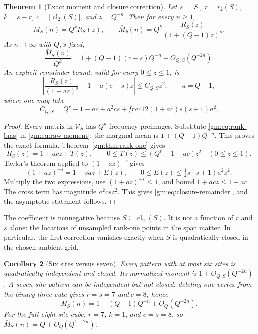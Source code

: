 \documentclass[11pt,a4paper]{article}
\numberwithin{equation}{section}
\newtheorem{theorem}{Theorem}[section]
\newtheorem{corollary}[theorem]{Corollary}
\theoremstyle{definition}
\theoremstyle{remark}
\newcommand{\1}{\mathbf 1}
\newcommand{\cl}{\operatorname{cl}}
\begin{document}
\begin{theorem}[Exact moment and closure correction]\label{gm:thm:closure}
Let $s=|S|$, $r=r_2(S)$, $k=s-r$, $c=|\cl_2(S)|$, and $z=Q^{-n}$.
Then for every $n\geq1$,
\begin{equation}\label{gm:eq:rank-moment}
 M_S(n)=Q^k R_S(z),\qquad
 \bar M_S(n)=Q^k\frac{R_S(z)}{(1+(Q-1)z)^s}.
\end{equation}
As $n\to\infty$ with $Q,S$ fixed,
\begin{equation}\label{gm:eq:closure-correction}
 \frac{\bar M_S(n)}{Q^k}
   =1+(Q-1)(c-s)Q^{-n}+O_{Q,S}(Q^{-2n}).
\end{equation}
An explicit remainder bound, valid for every $0\leq z\leq1$, is
\begin{equation}\label{gm:eq:closure-remainder}
 \left|\frac{R_S(z)}{(1+az)^s}-1-a(c-s)z\right|
 \leq C_{Q,S}z^2,\qquad a=Q-1,
\end{equation}
where one may take
\[
 C_{Q,S}=Q^r-1-ac+a^2cs+	frac12(1+ac)s(s+1)a^2.
\]
\end{theorem}

\begin{proof}
Every matrix in $\mathcal V_S$ has $Q^k$ frequency preimages. Substitute
\eqref{gm:eq:rank-bias} in \eqref{gm:eq:raw-moment}; the marginal mean is
$1+(Q-1)Q^{-n}$. This proves the exact formula.
Theorem~\ref{gm:thm:rank-one} gives
\[
 R_S(z)=1+ac z+T(z),\qquad
 0\leq T(z)\leq(Q^r-1-ac)z^2\quad(0\leq z\leq1).
\]
Taylor's theorem applied to $(1+az)^{-s}$ gives
\[
 (1+az)^{-s}=1-sa z+E(z),\qquad
 0\leq E(z)\leq\tfrac12s(s+1)a^2z^2.
\]
Multiply the two expressions, use $(1+az)^{-s}\leq1$, and bound
$1+ac z\leq1+ac$. The cross term has magnitude $a^2csz^2$.
This gives \eqref{gm:eq:closure-remainder}, and the asymptotic statement
follows.
\end{proof}

The coefficient is nonnegative because $S\subseteq\cl_2(S)$. It is not a
function of $r$ and $s$ alone: the locations of unsampled rank-one points
in the span matter. In particular, the first correction vanishes exactly
when $S$ is quadratically closed in the chosen ambient grid.

\begin{corollary}[Six sites versus seven]\label{gm:cor:six-seven}
Every pattern with at most six sites is quadratically independent and
closed. Its normalized moment is $1+O_{Q,S}(Q^{-2n})$.
A seven-site pattern can be independent but not closed: deleting one
vertex from the binary three-cube gives $r=s=7$ and $c=8$, hence
\[
 \bar M_S(n)=1+(Q-1)Q^{-n}+O_Q(Q^{-2n}).
\]
For the full eight-site cube, $r=7$, $k=1$, and $c=s=8$, so
$\bar M_S(n)=Q+O_Q(Q^{1-2n})$.
\end{corollary}
\end{document}
